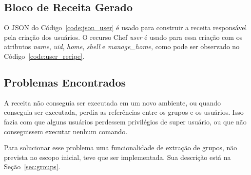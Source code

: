 \subsection{Bloco de Receita Gerado}

O JSON do Código~\ref{code:json_user} é usado para construir a receita responsável pela
criação dos usuários. O recurso Chef \textit{user} é usado para essa criação com
os atributos \textit{name}, \textit{uid}, \textit{home}, \textit{shell} e 
\textit{manage\_home}, como pode ser observado no Código~\ref{code:user_recipe}.

\noindent\begin{minipage}{\textwidth}
  \lstset{style=shell}
  
\end{minipage}\hfill

\subsection{Problemas Encontrados}
A receita não conseguia ser executada em um novo ambiente, ou quando conseguia
ser executada, perdia as referências entre os grupos e os usuários. Isso fazia
com que alguns usuários perdessem privilégios de super usuário, ou que não
conseguissem executar nenhum comando.

Para solucionar esse problema uma funcionalidade de extração de grupos, não prevista
no escopo inicial, teve que ser implementada. Sua descrição está na Seção~\ref{sec:groups}.
